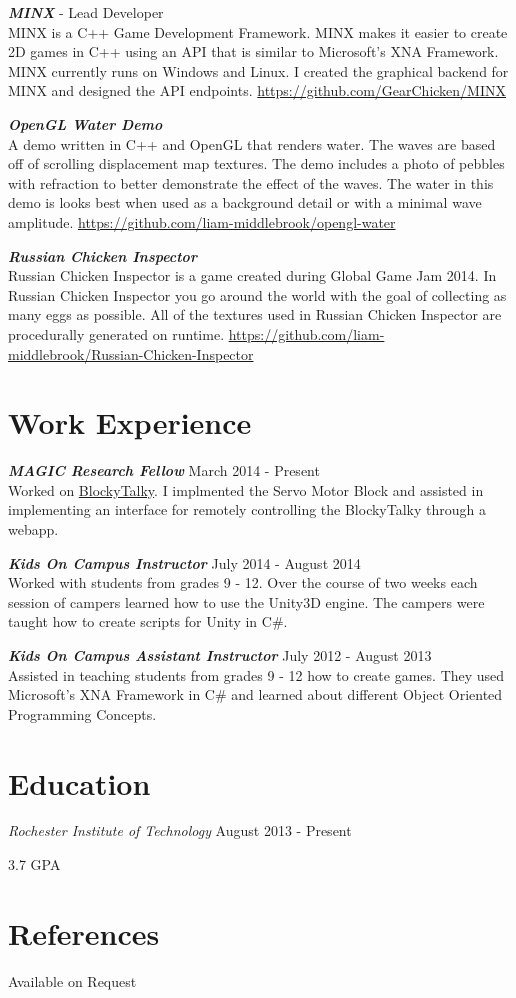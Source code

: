 \documentclass[line,margin]{res}
\begin{document}
\begin{resume}
{\textbf{\emph{MINX}}} - Lead Developer\\
MINX is a C++ Game Development Framework. MINX makes it easier to create 2D games in C++ using an API
that is similar to Microsoft's XNA Framework. MINX currently runs on Windows and Linux. I created the
graphical backend for MINX and designed the API endpoints. \url{https://github.com/GearChicken/MINX}

{\textbf{\emph{OpenGL Water Demo}}}\\
A demo written in C++ and OpenGL that renders water. The waves are based off of scrolling displacement
map textures. The demo includes a photo of pebbles with refraction to better demonstrate the effect
of the waves. The water in this demo is looks best when used as a background detail or with a minimal
wave amplitude. \url{https://github.com/liam-middlebrook/opengl-water}

{\textbf{\emph{Russian Chicken Inspector}}}\\
Russian Chicken Inspector is a game created during Global Game Jam 2014. In Russian Chicken Inspector
you go around the world with the goal of collecting as many eggs as possible. All of the textures used
in Russian Chicken Inspector are procedurally generated on runtime. \url {https://github.com/liam-middlebrook/Russian-Chicken-Inspector}


\section{Work Experience}

{\textbf{\emph{MAGIC Research Fellow}}} \hfill March 2014 - Present\\
Worked on \href{https://github.com/liam-middlebrook/blockytalky.git}{BlockyTalky}. I implmented
the Servo Motor Block and assisted in implementing an interface for remotely controlling the 
BlockyTalky through a webapp.

{\textbf{\emph{Kids On Campus Instructor}}} \hfill July 2014 - August 2014\\
Worked with students from grades 9 - 12. Over the course of two weeks each session of campers
learned how to use the Unity3D engine. The campers were taught how to create scripts for Unity
in C\#.

{\textbf{\emph{Kids On Campus Assistant Instructor}}} \hfill July 2012 - August 2013\\
Assisted in teaching students from grades 9 - 12 how to create games. They used Microsoft's 
XNA Framework in C\# and learned about different Object Oriented Programming Concepts.


\section{Education}
{\sl Rochester Institute of Technology} \hfill August 2013 - Present

 \hfill 3.7 GPA 


\section{References}
Available on Request


\end{resume}
\end{document}

